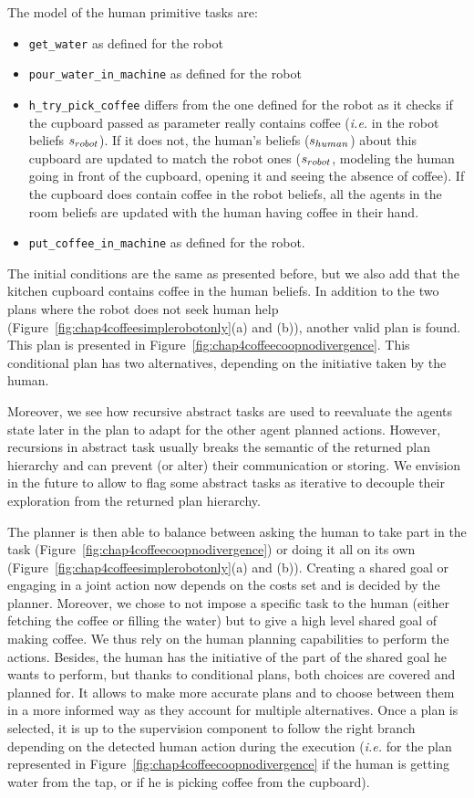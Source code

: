 \documentclass[a4paper,11pt,twoside]{StyleThese}
\begin{document}
The model of the human primitive tasks are:
\begin{itemize}
\item \verb'get_water' as defined for the robot
\item \verb'pour_water_in_machine' as defined for the robot
\item \verb'h_try_pick_coffee' differs from the one defined for the robot as it checks if the cupboard passed as parameter really contains coffee (\textit{i.e.} in the robot beliefs $s_{robot}$). If it does not, the human's beliefs ($s_{human}$) about this cupboard are updated to match the robot ones ($s_{robot}$, modeling the human going in front of the cupboard, opening it and seeing the absence of coffee). If the cupboard does contain coffee in the robot beliefs, all the agents in the room beliefs are updated with the human having coffee in their hand.
\item \verb'put_coffee_in_machine' as defined for the robot.
\end{itemize}

The initial conditions are the same as presented before, but we also add that the kitchen cupboard contains coffee in the human beliefs. In addition to the two plans where the robot does not seek human help (Figure~\ref{fig:chap4coffeesimplerobotonly}(a) and (b)), another valid plan is found. This plan is presented in Figure~\ref{fig:chap4coffeecoopnodivergence}. This conditional plan has two alternatives, depending on the initiative taken by the human.

Moreover, we see how recursive abstract tasks are used to reevaluate the agents state later in the plan to adapt for the other agent planned actions. However, recursions in abstract task usually breaks the semantic of the returned plan hierarchy and can prevent (or alter) their communication or storing. We envision in the future to allow to flag some abstract tasks as iterative to decouple their exploration from the returned plan hierarchy.

The planner is then able to balance between asking the human to take part in the task (Figure~\ref{fig:chap4coffeecoopnodivergence}) or doing it all on its own (Figure~\ref{fig:chap4coffeesimplerobotonly}(a) and (b)). Creating a shared goal or engaging in a joint action now depends on the costs set and is decided by the planner. Moreover, we chose to not impose a specific task to the human (either fetching the coffee or filling the water) but to give a high level shared goal of making coffee. We thus rely on the human planning capabilities to perform the actions. Besides, the human has the initiative of the part of the shared goal he wants to perform, but thanks to conditional plans, both choices are covered and planned for. It allows to make more accurate plans and to choose between them in a more informed way as they account for multiple alternatives. Once a plan is selected, it is up to the supervision component to follow the right branch depending on the detected human action during the execution (\textit{i.e.} for the plan represented in Figure~\ref{fig:chap4coffeecoopnodivergence} if the human is getting water from the tap, or if he is picking coffee from the cupboard).
\end{document}
